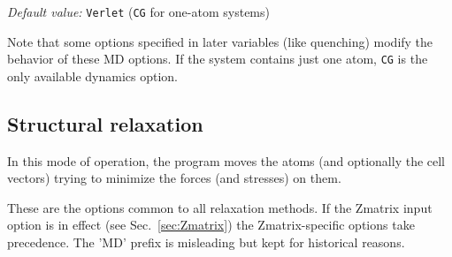 \documentclass[11pt]{article}
\begin{document}
{\it Default value:} {\tt Verlet} ({\tt CG} for one-atom systems)

Note that some options specified in later variables
(like quenching) modify the behavior of these MD options.
If the system contains just one atom, {\tt CG} is the only
available dynamics option.


\subsection{Structural relaxation}

In this mode of operation, the program moves the atoms (and optionally
the cell vectors) trying to minimize the forces (and stresses) on
them.

These are the options common to all relaxation methods. If the Zmatrix
input option is in effect (see Sec.~\ref{sec:Zmatrix}) the
Zmatrix-specific options take precedence.  The 'MD' prefix is
misleading but kept for historical reasons.
\end{document}
